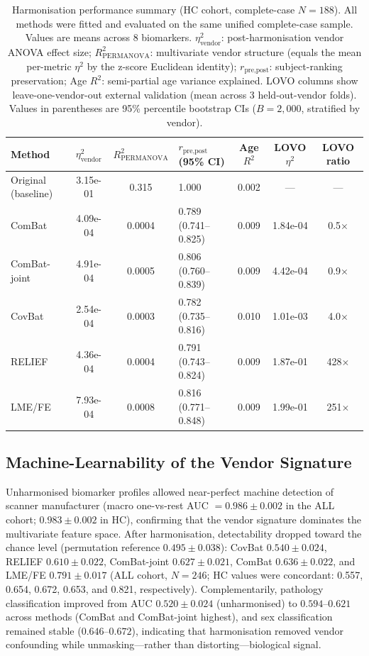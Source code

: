\documentclass[12pt,a4paper]{article}
\begin{document}
\begin{table}[H]
\centering
\scriptsize
\setlength{\tabcolsep}{2.5pt}
\caption{Harmonisation performance summary (HC cohort, complete-case $N=188$). All methods were fitted and evaluated on the same unified complete-case sample. Values are means across 8 biomarkers. $\eta^2_{\text{vendor}}$: post-harmonisation vendor ANOVA effect size; $R^2_{\text{PERMANOVA}}$: multivariate vendor structure (equals the mean per-metric $\eta^2$ by the z-score Euclidean identity); $r_{\text{pre,post}}$: subject-ranking preservation; Age $R^2$: semi-partial age variance explained. LOVO columns show leave-one-vendor-out external validation (mean across 3 held-out-vendor folds). Values in parentheses are 95\% percentile bootstrap CIs ($B=2{,}000$, stratified by vendor).}
\label{tab:results}
\begin{tabular}{lSSlSSS}
\toprule
Method & {$\eta^2_{\text{vendor}}$} & {$R^2_{\text{PERMANOVA}}$} & {$r_{\text{pre,post}}$ (95\% CI)} & {Age $R^2$} & {LOVO $\eta^2$} & {LOVO ratio} \\
\midrule
Original (baseline) & 3.15e-01 & 0.315 & 1.000 & 0.002 & {---} & {---} \\
ComBat & 4.09e-04 & 0.0004 & 0.789 (0.741--0.825) & 0.009 & 1.84e-04 & 0.5$\times$ \\
ComBat-joint & 4.91e-04 & 0.0005 & 0.806 (0.760--0.839) & 0.009 & 4.42e-04 & 0.9$\times$ \\
CovBat & 2.54e-04 & 0.0003 & 0.782 (0.735--0.816) & 0.010 & 1.01e-03 & 4.0$\times$ \\
RELIEF & 4.36e-04 & 0.0004 & 0.791 (0.743--0.824) & 0.009 & 1.87e-01 & 428$\times$ \\
LME/FE & 7.93e-04 & 0.0008 & 0.816 (0.771--0.848) & 0.009 & 1.99e-01 & 251$\times$ \\
\bottomrule
\end{tabular}
\end{table}

\subsection{Machine-Learnability of the Vendor Signature}

Unharmonised biomarker profiles allowed near-perfect machine detection of scanner manufacturer (macro one-vs-rest AUC $=0.986\pm0.002$ in the ALL cohort; $0.983\pm0.002$ in HC), confirming that the vendor signature dominates the multivariate feature space. After harmonisation, detectability dropped toward the chance level (permutation reference $0.495\pm0.038$): CovBat $0.540\pm0.024$, RELIEF $0.610\pm0.022$, ComBat-joint $0.627\pm0.021$, ComBat $0.636\pm0.022$, and LME/FE $0.791\pm0.017$ (ALL cohort, $N=246$; HC values were concordant: 0.557, 0.654, 0.672, 0.653, and 0.821, respectively). Complementarily, pathology classification improved from AUC $0.520\pm0.024$ (unharmonised) to $0.594$--$0.621$ across methods (ComBat and ComBat-joint highest), and sex classification remained stable ($0.646$--$0.672$), indicating that harmonisation removed vendor confounding while unmasking---rather than distorting---biological signal.
\end{document}
